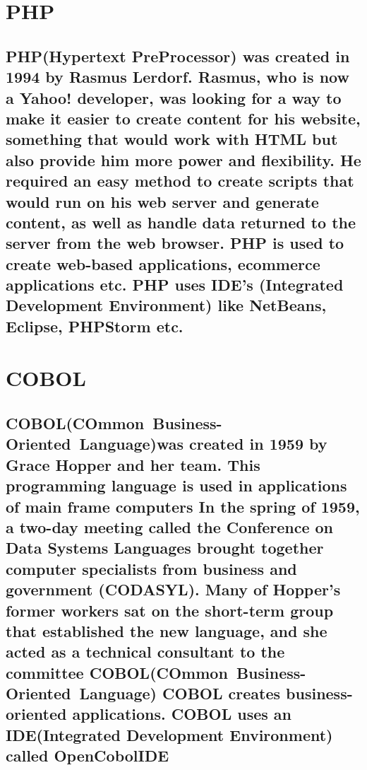 \documentclass{article}
\begin{document}
\section{PHP}
\subsection{PHP(Hypertext PreProcessor) was created in 1994 by Rasmus Lerdorf.
	Rasmus, who is now a Yahoo! developer, was looking for a way to make it easier to create content for his website, something that would work with HTML but also provide him more power and flexibility. He required an easy method to create scripts that would run on his web server and generate content, as well as handle data returned to the server from the web browser.
	PHP is used to create web-based applications, ecommerce  applications etc.
	PHP uses  IDE’s (Integrated Development Environment) like NetBeans, Eclipse, PHPStorm etc.  
}
\newpage
\section{COBOL}
\subsection{COBOL(COmmon Business-Oriented Language)was created in 1959 by Grace Hopper and her team. This programming language is used in applications of main frame computers
	In the spring of 1959, a two-day meeting called the Conference on Data Systems Languages brought together computer specialists from business and government (CODASYL). Many of Hopper's former workers sat on the short-term group that established the new language, and she acted as a technical consultant to the committee COBOL(COmmon Business-Oriented Language)
	COBOL creates business-oriented applications.
	COBOL uses an IDE(Integrated Development Environment) called OpenCobolIDE
}
\newpage
\
 
\end{document}
